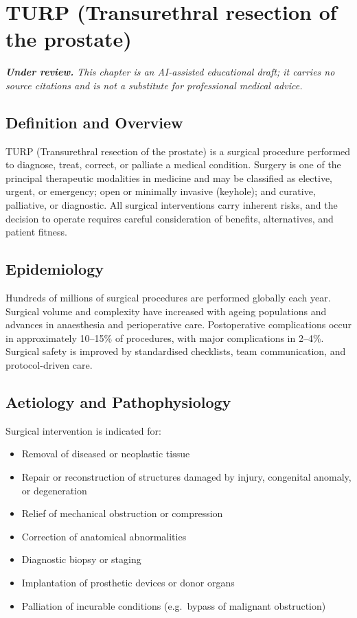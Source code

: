 \chapter{TURP (Transurethral resection of the prostate)}

\medskip
\noindent\textit{\textbf{Under review.} This chapter is an AI-assisted educational draft; it carries no source citations and is not a substitute for professional medical advice.}

\section*{Definition and Overview}
TURP (Transurethral resection of the prostate) is a surgical procedure performed to diagnose, treat, correct, or palliate a medical condition. Surgery is one of the principal therapeutic modalities in medicine and may be classified as elective, urgent, or emergency; open or minimally invasive (keyhole); and curative, palliative, or diagnostic. All surgical interventions carry inherent risks, and the decision to operate requires careful consideration of benefits, alternatives, and patient fitness.

\section*{Epidemiology}
Hundreds of millions of surgical procedures are performed globally each year. Surgical volume and complexity have increased with ageing populations and advances in anaesthesia and perioperative care. Postoperative complications occur in approximately 10--15\% of procedures, with major complications in 2--4\%. Surgical safety is improved by standardised checklists, team communication, and protocol-driven care.

\section*{Aetiology and Pathophysiology}
Surgical intervention is indicated for:

\begin{itemize}
    \item Removal of diseased or neoplastic tissue
    \item Repair or reconstruction of structures damaged by injury, congenital anomaly, or degeneration
    \item Relief of mechanical obstruction or compression
    \item Correction of anatomical abnormalities
    \item Diagnostic biopsy or staging
    \item Implantation of prosthetic devices or donor organs
    \item Palliation of incurable conditions (e.g.\ bypass of malignant obstruction)
\end{itemize}

